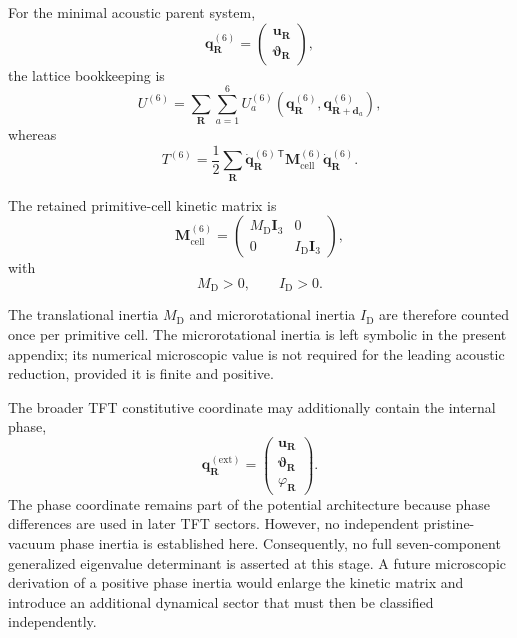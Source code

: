 For the minimal acoustic parent system,
\begin{equation}
    \mathbf{q}_{\mathbf{R}}^{(6)}
    =
    \begin{pmatrix}
        \mathbf{u}_{\mathbf{R}}\\
        \boldsymbol{\vartheta}_{\mathbf{R}}
    \end{pmatrix},
\end{equation}
the lattice bookkeeping is
\begin{equation}
    U^{(6)} = \sum_{\mathbf{R}} \sum_{a=1}^{6} U_a^{(6)}\!\left( \mathbf{q}_{\mathbf{R}}^{(6)}, \mathbf{q}_{\mathbf{R}+\mathbf{d}_a}^{(6)} \right),
\end{equation}
whereas
\begin{equation}
    T^{(6)} = \frac{1}{2} \sum_{\mathbf{R}} \dot{\mathbf{q}}_{\mathbf{R}}^{(6)\,\mathsf{T}} \mathbf{M}_{\mathrm{cell}}^{(6)} \dot{\mathbf{q}}_{\mathbf{R}}^{(6)}.
\end{equation}

The retained primitive-cell kinetic matrix is
\begin{equation}
    \mathbf{M}_{\mathrm{cell}}^{(6)}
    =
    \begin{pmatrix}
        M_{\mathrm{D}}\mathbf{I}_3 & 0\\
        0 & I_{\mathrm{D}}\mathbf{I}_3
    \end{pmatrix},
\end{equation}
with
\begin{equation}
    M_{\mathrm{D}}>0, \qquad I_{\mathrm{D}}>0.
\end{equation}

The translational inertia $M_{\mathrm{D}}$ and microrotational inertia $I_{\mathrm{D}}$ are therefore counted once per primitive cell. The microrotational inertia is left symbolic in the present appendix; its numerical microscopic value is not required for the leading acoustic reduction, provided it is finite and positive.

The broader TFT constitutive coordinate may additionally contain the internal phase,
\begin{equation}
    \mathbf{q}_{\mathbf{R}}^{(\mathrm{ext})}
    =
    \begin{pmatrix}
        \mathbf{u}_{\mathbf{R}}\\
        \boldsymbol{\vartheta}_{\mathbf{R}}\\
        \varphi_{\mathbf{R}}
    \end{pmatrix}.
\end{equation}
The phase coordinate remains part of the potential architecture because phase differences are used in later TFT sectors. However, no independent pristine-vacuum phase inertia is established here. Consequently, no full seven-component generalized eigenvalue determinant is asserted at this stage. A future microscopic derivation of a positive phase inertia would enlarge the kinetic matrix and introduce an additional dynamical sector that must then be classified independently.

